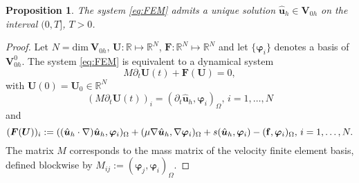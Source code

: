 \documentclass[10pt]{amsart}
\numberwithin{equation}{section}
\newtheorem{proposition}[theorem]{Proposition}
\theoremstyle{definition}
\theoremstyle{remark}
\newcommand{\bF}{\bld{F}}
\renewcommand{\(}{\bigl(}
\renewcommand{\)}{\bigr)}
\newcommand{\bld}[1]{\boldsymbol{#1}}
\newcommand{\bhu}{\hat{\bld{u}}}
\newcommand{\bU}{\bld{U}}
\newcommand{\bV}{\bld{V}}
\newcommand{\bvarphi}{\bm \varphi}
\begin{document}
\begin{proposition}
The system \eqref{eq:FEM}  admits a
unique solution $\bhu_h \in \bV_{0h}$ on the interval $(0,T]$, $T>0$.
\end{proposition}
\begin{proof}
Let $N = \mbox{dim} ~\bV_{0h}$, $\bU: \mathbb{R} \mapsto
\mathbb{R}^N$, $\bF: \mathbb{R}^N \mapsto
\mathbb{R}^N$ and let $\{\bvarphi_i\}$ denotes a basis of $\bV^0_{0h}$. The system \eqref{eq:FEM} is equivalent to a dynamical
system 
\[
M\partial_t \bU(t) + \bF(\bU) = 0,
\]
with $\bU(0) = \bU_0 \in \mathbb{R}^N$
\[
(M\partial_t \bU(t))_i =  (\partial_t \bhu_h, \bvarphi_i)_\Omega,\, i=1,\hdots,N
\]
and
\[
(\bF(\bU))_i :=((\bhu_h \cdot \nabla) \bhu_h, \bvarphi_i)_\Omega + (\mu \nabla \bhu_h,\nabla \bvarphi_i)_\Omega + s(\bhu_h,\bvarphi_i)
- ({\bf f}, \bvarphi_i)_\Omega,\, i=1,\hdots,N.
\]
The matrix $M$ corresponds to
the mass matrix of the velocity finite element basis, defined
blockwise by $M_{ij}:= (\bvarphi_j,\bvarphi_i)_\Omega$. 


\end{proof}
\end{document}
